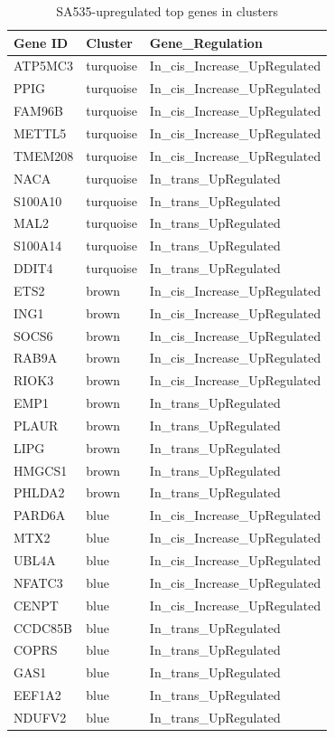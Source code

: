  \begin{table}[htbp]
   \centering
   \caption{SA535-upregulated top genes in clusters}
     \begin{tabular}{|l|l|l|}
     \hline
     Gene ID & Cluster & Gene\_Regulation \\
     \hline
     ATP5MC3 & turquoise & In\_cis\_Increase\_UpRegulated \\
     PPIG & turquoise & In\_cis\_Increase\_UpRegulated \\
     FAM96B & turquoise & In\_cis\_Increase\_UpRegulated \\
     METTL5 & turquoise & In\_cis\_Increase\_UpRegulated \\
     TMEM208 & turquoise & In\_cis\_Increase\_UpRegulated \\
     NACA & turquoise & In\_trans\_UpRegulated \\
     S100A10 & turquoise & In\_trans\_UpRegulated \\
     MAL2 & turquoise & In\_trans\_UpRegulated \\
     S100A14 & turquoise & In\_trans\_UpRegulated \\
     DDIT4 & turquoise & In\_trans\_UpRegulated \\
     ETS2 & brown & In\_cis\_Increase\_UpRegulated \\
     ING1 & brown & In\_cis\_Increase\_UpRegulated \\
     SOCS6 & brown & In\_cis\_Increase\_UpRegulated \\
     RAB9A & brown & In\_cis\_Increase\_UpRegulated \\
     RIOK3 & brown & In\_cis\_Increase\_UpRegulated \\
     EMP1 & brown & In\_trans\_UpRegulated \\
     PLAUR & brown & In\_trans\_UpRegulated \\
     LIPG & brown & In\_trans\_UpRegulated \\
     HMGCS1 & brown & In\_trans\_UpRegulated \\
     PHLDA2 & brown & In\_trans\_UpRegulated \\
     PARD6A & blue & In\_cis\_Increase\_UpRegulated \\
     MTX2 & blue & In\_cis\_Increase\_UpRegulated \\
     UBL4A & blue & In\_cis\_Increase\_UpRegulated \\
     NFATC3 & blue & In\_cis\_Increase\_UpRegulated \\
     CENPT & blue & In\_cis\_Increase\_UpRegulated \\
     CCDC85B & blue & In\_trans\_UpRegulated \\
     COPRS & blue & In\_trans\_UpRegulated \\
     GAS1 & blue & In\_trans\_UpRegulated \\
     EEF1A2 & blue & In\_trans\_UpRegulated \\
     NDUFV2 & blue & In\_trans\_UpRegulated \\
     \hline
     \end{tabular}%
   \label{tab:SA535upregulatedgenesinclusters}%
 \end{table}%
